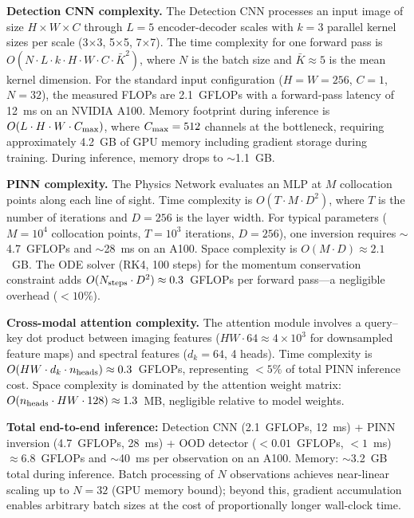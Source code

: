 \documentclass[usenatbib]{mnras}
\begin{document}
\textbf{Detection CNN complexity.} The Detection CNN processes an input image of size $H \times W \times C$ through $L = 5$ encoder-decoder scales with $k = 3$ parallel kernel sizes per scale (3$\times$3, 5$\times$5, 7$\times$7). The time complexity for one forward pass is $O(N \cdot L \cdot k \cdot H \cdot W \cdot C \cdot \bar{K}^2)$, where $N$ is the batch size and $\bar{K} \approx 5$ is the mean kernel dimension. For the standard input configuration ($H=W=256$, $C=1$, $N=32$), the measured FLOPs are 2.1~GFLOPs with a forward-pass latency of 12~ms on an NVIDIA A100. Memory footprint during inference is $O(L \cdot H \cdot W \cdot C_{\rm max})$, where $C_{\rm max}=512$ channels at the bottleneck, requiring approximately 4.2~GB of GPU memory including gradient storage during training. During inference, memory drops to $\sim$1.1~GB.

\textbf{PINN complexity.} The Physics Network evaluates an MLP at $M$ collocation points along each line of sight. Time complexity is $O(T \cdot M \cdot D^2)$, where $T$ is the number of iterations and $D=256$ is the layer width. For typical parameters ($M=10^4$ collocation points, $T=10^3$ iterations, $D=256$), one inversion requires $\sim$4.7~GFLOPs and $\sim$28~ms on an A100. Space complexity is $O(M \cdot D) \approx 2.1$~GB. The ODE solver (RK4, 100 steps) for the momentum conservation constraint adds $O(N_{\rm steps} \cdot D^2) \approx 0.3$~GFLOPs per forward pass---a negligible overhead ($<10\%$).

\textbf{Cross-modal attention complexity.} The attention module involves a query--key dot product between imaging features ($HW \cdot 64 \approx 4 \times 10^3$ for downsampled feature maps) and spectral features ($d_k=64$, 4 heads). Time complexity is $O(HW \cdot d_k \cdot n_{\rm heads}) \approx 0.3$~GFLOPs, representing $<5\%$ of total PINN inference cost. Space complexity is dominated by the attention weight matrix: $O(n_{\rm heads} \cdot HW \cdot 128) \approx 1.3$~MB, negligible relative to model weights.

\textbf{Total end-to-end inference:} Detection CNN (2.1~GFLOPs, 12~ms) + PINN inversion (4.7~GFLOPs, 28~ms) + OOD detector ($<0.01$~GFLOPs, $<1$~ms) $\approx 6.8$~GFLOPs and $\sim$40~ms per observation on an A100. Memory: $\sim$3.2~GB total during inference. Batch processing of $N$ observations achieves near-linear scaling up to $N=32$ (GPU memory bound); beyond this, gradient accumulation enables arbitrary batch sizes at the cost of proportionally longer wall-clock time.
\end{document}
